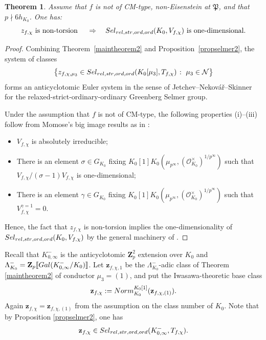 \documentclass[10pt,letterpaper]{amsart}
\theoremstyle{plain}
\newtheorem{thm}{Theorem}[subsection] %
\theoremstyle{definition}
\theoremstyle{definition}
\theoremstyle{plain}
\theoremstyle{plain}
\theoremstyle{plain}
\theoremstyle{remark}
\numberwithin{equation}{section}
\newcommand{\relstr}{{{\rm rel},{\rm str}}}
\newcommand{\ord}{{{\rm ord},{\rm ord}}}
\def\cO{\mathcal O}
\newcommand{\Z}{\mathbf{Z}}
\newcommand{\dBr}[1]{\llbracket{#1}\rrbracket}
\begin{document}
\begin{thm}\label{thm:rank-1-general}
Assume that $f$ is not of CM-type, non-Eisenstein at $\mathfrak{P}$, and that $p\nmid 6h_{K_0}$. One has: 
$$z_{f,\chi} \text{ is non-torsion } \quad\Rightarrow\quad{\rm Sel}_{\relstr,\ord}(K_0,V_{f,\chi}) \text{ is one-dimensional.}$$

\end{thm}

\begin{proof}
 Combining Theorem~\ref{maintheorem2} and Proposition~\ref{propselmer2}, the system of classes 
\begin{equation}\label{eq:ES-rel-str}
\bigl\{z_{f,\chi,\mu_3}\in{\rm Sel}_{\relstr,\ord}(K_0[\mu_3],T_{f,\chi})\;\colon\;\mu_3\in\mathcal{N}\bigr\}
\end{equation}
forms an anticyclotomic Euler system in the sense of  Jetchev--Nekov\'a{\v r}--Skinner \cite{JNS} for the relaxed-strict-ordinary-ordinary Greenberg Selmer group. 

Under the assumption that $f$ is not of CM-type, the following properties (i)--(iii) follow from Momose's big image results \cite{Momo} as in \cite[Prop.\,7.1.4]{LLZ-K}:
\begin{itemize}
    \item[(i)] $V_{f,\chi}$ is absolutely irreducible;
    \item[(ii)] There is an element $\sigma\in G_{K_0}$ fixing $K_0[1]K_0(\mu_{p^\infty},(\cO_{K_0}^\times)^{1/p^\infty})$ such that $V_{f,\chi}/(\sigma-1)V_{f,\chi}$ is one-dimensional;
    \item[(iii)] There is an element $\gamma\in G_{K_0}$ fixing $K_0[1]K_0(\mu_{p^\infty},(\cO_{K_0}^\times)^{1/p^\infty})$ such that $V_{f,\chi}^{\gamma=1}=0$.
\end{itemize}
Hence, the fact that $z_{f,\chi}$ is non-torsion implies the one-dimensionality of ${\rm Sel}_{\relstr,\ord}(K_0,V_{f,\chi})$ by the general machinery of \cite{JNS}.
\end{proof}





Recall that $K_{0,\infty}^-$ is the anticyclotomic $\Z_p^2$ extension over $K_0$ and $\Lambda_{K_0}^-=\Z_p\dBr{{\rm Gal}(K_{0,\infty}^-/K_0)}$. 
Let $\mathbf{z}_{f,\chi,1}$ be the $\Lambda_{K_0}^-$-adic class of Theorem\,\ref{maintheorem2} of conductor $\mu_3=(1)$, and put the Iwasawa-theoretic base class
\[
\mathbf{z}_{f,\chi}:={\rm Norm}^{K_0[1]}_{K_0}(\mathbf{z}_{f,\chi,(1)}).
\]
Again $\mathbf{z}_{f,\chi}=\mathbf{z}_{f,\chi,(1)}$ from the assumption on the class number of $K_0$. Note that by Proposition \ref{propselmer2}, one has
\[
\mathbf{z}_{f,\chi}\in{\rm Sel}_{\relstr,\ord}(K_{0,\infty}^-,T_{f,\chi}).
\]
\end{document}
